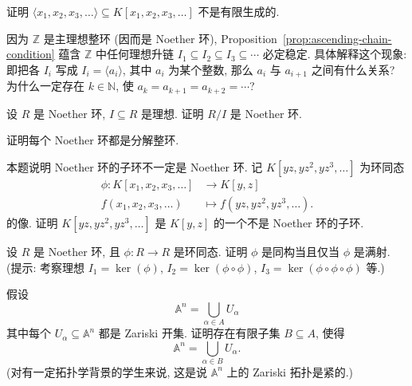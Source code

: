 \BookExerciseHeading
\begin{BookExercises}
  \item\label{ex:infinite-variable-ideal-not-finitely-generated} 证明 $\langle x_{1},x_{2},x_{3},\ldots\rangle\subseteq K[x_{1},x_{2},x_{3},\ldots]$ 不是有限生成的.
  \item\label{ex:ascending-chain-of-integer-ideals} 因为 $\mathbb{Z}$ 是主理想整环 (因而是 Noether 环), Proposition~\ref{prop:ascending-chain-condition} 蕴含 $\mathbb{Z}$ 中任何理想升链 $I_{1}\subseteq I_{2}\subseteq I_{3}\subseteq\cdots$ 必定稳定. 具体解释这个现象: 即把各 $I_{i}$ 写成 $I_{i}=\langle a_{i}\rangle$, 其中 $a_{i}$ 为某个整数, 那么 $a_{i}$ 与 $a_{i+1}$ 之间有什么关系? 为什么一定存在 $k\in\mathbb{N}$, 使 $a_{k}=a_{k+1}=a_{k+2}=\cdots$?
  \item\label{ex:quotient-of-noetherian-ring} 设 $R$ 是 Noether 环, $I\subseteq R$ 是理想. 证明 $R/I$ 是 Noether 环.
  \item\label{ex:noetherian-ring-as-factorization-domain} 证明每个 Noether 环都是分解整环.
  \item\label{ex:subring-need-not-be-noetherian} 本题说明 Noether 环的子环不一定是 Noether 环. 记 $K[yz,yz^{2},yz^{3},\ldots]$ 为环同态
    \[
      \begin{aligned}
        \phi:K[x_{1},x_{2},x_{3},\ldots]&\to K[y,z]\\
        f(x_{1},x_{2},x_{3},\ldots)&\mapsto f(yz,yz^{2},yz^{3},\ldots).
      \end{aligned}
    \]
    的像. 证明 $K[yz,yz^{2},yz^{3},\ldots]$ 是 $K[y,z]$ 的一个不是 Noether 环的子环.
  \item\label{ex:noetherian-surjective-endomorphism} 设 $R$ 是 Noether 环, 且 $\phi:R\to R$ 是环同态. 证明 $\phi$ 是同构当且仅当 $\phi$ 是满射. (提示: 考察理想 $I_{1}=\ker(\phi)$, $I_{2}=\ker(\phi\circ\phi)$, $I_{3}=\ker(\phi\circ\phi\circ\phi)$ 等.)
  \item\label{ex:zariski-topology-is-compact} 假设
    \[
      \mathbb{A}^{n}=\bigcup_{\alpha\in A}U_{\alpha}
    \]
    其中每个 $U_{\alpha}\subseteq\mathbb{A}^{n}$ 都是 Zariski 开集. 证明存在有限子集 $B\subseteq A$, 使得
    \[
      \mathbb{A}^{n}=\bigcup_{\alpha\in B}U_{\alpha}.
    \]
    (对有一定拓扑学背景的学生来说, 这是说 $\mathbb{A}^{n}$ 上的 Zariski 拓扑是紧的.)
\end{BookExercises}
